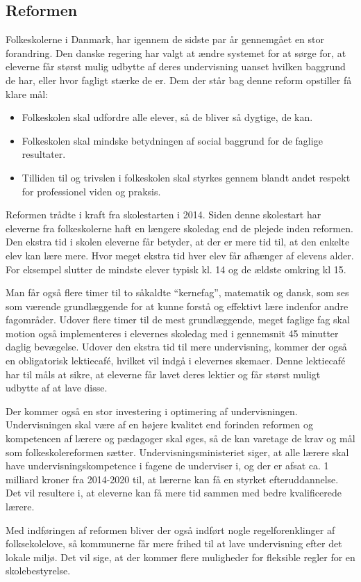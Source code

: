 \subsection{Reformen}
\label{Reformen}
Folkeskolerne i Danmark, har igennem de sidste par år gennemgået en stor forandring. Den danske regering har valgt at ændre systemet for at sørge for, at eleverne får størst mulig udbytte af deres undervisning uanset hvilken baggrund de har, eller hvor fagligt stærke de er.
Dem der står bag denne reform opstiller få klare mål:
	\begin{itemize}
		\item Folkeskolen skal udfordre alle elever, så de bliver så dygtige, de kan.
		\item Folkeskolen skal mindske betydningen af social baggrund for de faglige resultater.
		\item Tilliden til og trivslen i folkeskolen skal styrkes gennem blandt andet respekt for professionel viden og praksis.
	\end{itemize}

Reformen trådte i kraft fra skolestarten i 2014. Siden denne skolestart har eleverne fra folkeskolerne haft en længere skoledag end de plejede inden reformen. Den ekstra tid i skolen eleverne får betyder, at der er mere tid til, at den enkelte elev kan lære mere. Hvor meget ekstra tid hver elev får afhænger af elevens alder. For eksempel slutter de mindste elever typisk kl. 14 og de ældste omkring kl 15.

Man får også flere timer til to såkaldte ``kernefag”, matematik og dansk, som ses som værende grundlæggende for at kunne forstå og effektivt lære indenfor andre fagområder. Udover flere timer til de mest grundlæggende, meget faglige fag skal motion også implementeres i elevernes skoledag med i gennemsnit 45 minutter daglig bevægelse. Udover den ekstra tid til mere undervisning, kommer der også en obligatorisk lektiecafé, hvilket vil indgå i elevernes skemaer. Denne lektiecafé har til måls at sikre, at eleverne får lavet deres lektier og får størst muligt udbytte af at lave disse.

Der kommer også en stor investering i optimering af undervisningen. Undervisningen skal være af en højere kvalitet end forinden reformen og kompetencen af lærere og pædagoger skal øges, så de kan varetage de krav og mål som folkeskolereformen sætter. Undervisningsministeriet siger, at alle lærere skal have undervisningskompetence i fagene de underviser i, og der er afsat ca. 1 milliard kroner fra 2014-2020 til, at lærerne kan få en styrket efteruddannelse. Det vil resultere i, at eleverne kan få mere tid sammen med bedre kvalificerede lærere.

Med indføringen af reformen bliver der også indført nogle regelforenklinger af folksekolelove, så kommunerne får mere frihed til at lave undervisning efter det lokale miljø. Det vil sige, at der kommer flere muligheder for fleksible regler for en skolebestyrelse.
